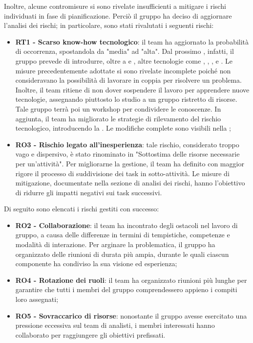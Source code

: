 \vspace{0.5\baselineskip}
\par Inoltre, alcune contromisure si sono rivelate insufficienti a mitigare i rischi individuati in fase di pianificazione. Perciò il gruppo ha deciso di aggiornare l'analisi dei rischi; in particolare, sono stati rivalutati i seguenti rischi:
\begin{itemize}
  \item \textbf{RT1 - Scarso know-how tecnologico}: il team ha aggiornato la probabilità di occorrenza, spostandola da "media" ad "alta". Dal prossimo , infatti, il gruppo prevede di introdurre, oltre a  e , altre tecnologie come , , ,  e . Le misure precedentemente adottate si sono rivelate incomplete poiché non consideravano la possibilità di lavorare in coppia per risolvere un problema. Inoltre, il team ritiene di non dover sospendere il lavoro per apprendere nuove tecnologie, assegnando piuttosto lo studio a un gruppo ristretto di risorse. Tale gruppo terrà poi un workshop per condividere le conoscenze. In aggiunta, il team ha migliorato le strategie di rilevamento del rischio tecnologico, introducendo la . Le modifiche complete sono visibili nella ;
  \item \textbf{RO3 - Rischio legato all'inesperienza}: tale rischio, considerato troppo vago e dispersivo, è stato rinominato in "Sottostima delle risorse necessarie per un'attività". Per migliorarne la gestione, il team ha definito con maggior rigore il processo di suddivisione dei task in sotto-attività. Le misure di mitigazione, documentate nella sezione di analisi dei rischi, hanno l'obiettivo di ridurre gli impatti negativi sui task successivi.
\end{itemize}

\vspace{0.5\baselineskip}
\par Di seguito sono elencati i rischi gestiti con successo:
\begin{itemize}
  \item \textbf{RO2 - Collaborazione}: il team ha incontrato degli ostacoli nel lavoro di gruppo, a causa delle differenze in termini di tempistiche, competenze e modalità di interazione. Per arginare la problematica, il gruppo ha organizzato delle riunioni di durata più ampia, durante le quali ciascun componente ha condiviso la sua visione ed esperienza;
  \item \textbf{RO4 - Rotazione dei ruoli}: il team ha organizzato riunioni più lunghe per garantire che tutti i membri del gruppo comprendessero appieno i compiti loro assegnati;
  \item \textbf{RO5 - Sovraccarico di risorse}: nonostante il gruppo avesse esercitato una pressione eccessiva sul team di analisti, i membri interessati hanno collaborato per raggiungere gli obiettivi prefissati.
\end{itemize}
